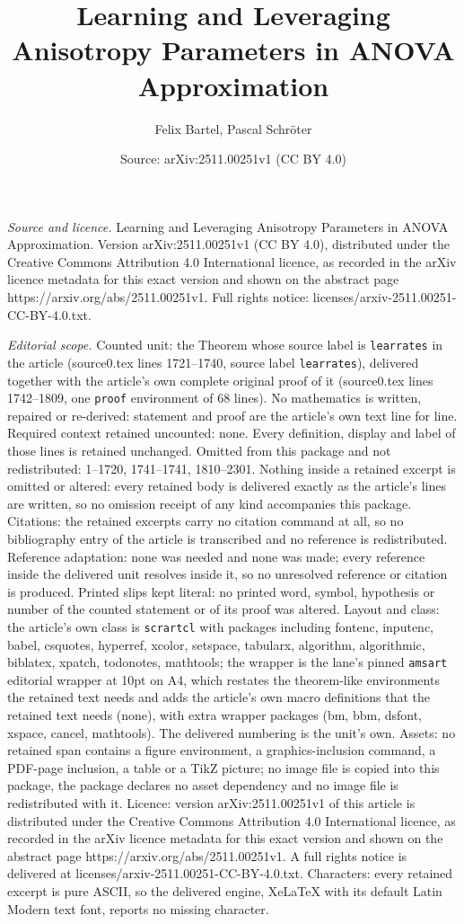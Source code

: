 \documentclass[10pt,a4paper]{amsart}
\title[Learning and Leveraging Anisotropy Parameters in ANOVA Appro]{Learning and Leveraging Anisotropy Parameters in ANOVA Approximation}
\author{Felix Bartel, Pascal Schr\"oter}
\date{Source: arXiv:2511.00251v1 (CC BY 4.0)}
\begin{document}
\maketitle

\noindent\emph{Source and licence.} Learning and Leveraging Anisotropy Parameters in ANOVA Approximation. Version arXiv:2511.00251v1 (CC BY 4.0), distributed under the Creative Commons Attribution 4.0 International licence, as recorded in the arXiv licence metadata for this exact version and shown on the abstract page https://arxiv.org/abs/2511.00251v1. Full rights notice: licenses/arxiv-2511.00251-CC-BY-4.0.txt.\par\smallskip

\noindent\textit{Editorial scope.} Counted unit: the Theorem whose source label is \texttt{learrates} in the article (source0.tex lines 1721--1740, source label \texttt{learrates}), delivered together with the article's own complete original proof of it (source0.tex lines 1742--1809, one \texttt{proof} environment of 68 lines). No mathematics is written, repaired or re-derived: statement and proof are the article's own text line for line. Required context retained uncounted: none. Every definition, display and label of those lines is retained unchanged. Omitted from this package and not redistributed: 1--1720, 1741--1741, 1810--2301. Nothing inside a retained excerpt is omitted or altered: every retained body is delivered exactly as the article's lines are written, so no omission receipt of any kind accompanies this package. Citations: the retained excerpts carry no citation command at all, so no bibliography entry of the article is transcribed and no reference is redistributed. Reference adaptation: none was needed and none was made; every reference inside the delivered unit resolves inside it, so no unresolved reference or citation is produced. Printed slips kept literal: no printed word, symbol, hypothesis or number of the counted statement or of its proof was altered. Layout and class: the article's own class is \texttt{scrartcl} with packages including fontenc, inputenc, babel, csquotes, hyperref, xcolor, setspace, tabularx, algorithm, algorithmic, biblatex, xpatch, todonotes, mathtools; the wrapper is the lane's pinned \texttt{amsart} editorial wrapper at 10pt on A4, which restates the theorem-like environments the retained text needs and adds the article's own macro definitions that the retained text needs (none), with extra wrapper packages (bm, bbm, dsfont, xspace, cancel, mathtools). The delivered numbering is the unit's own. Assets: no retained span contains a figure environment, a graphics-inclusion command, a PDF-page inclusion, a table or a TikZ picture; no image file is copied into this package, the package declares no asset dependency and no image file is redistributed with it. Licence: version arXiv:2511.00251v1 of this article is distributed under the Creative Commons Attribution 4.0 International licence, as recorded in the arXiv licence metadata for this exact version and shown on the abstract page https://arxiv.org/abs/2511.00251v1. A full rights notice is delivered at licenses/arxiv-2511.00251-CC-BY-4.0.txt. Characters: every retained excerpt is pure ASCII, so the delivered engine, XeLaTeX with its default Latin Modern text font, reports no missing character.
\end{document}

